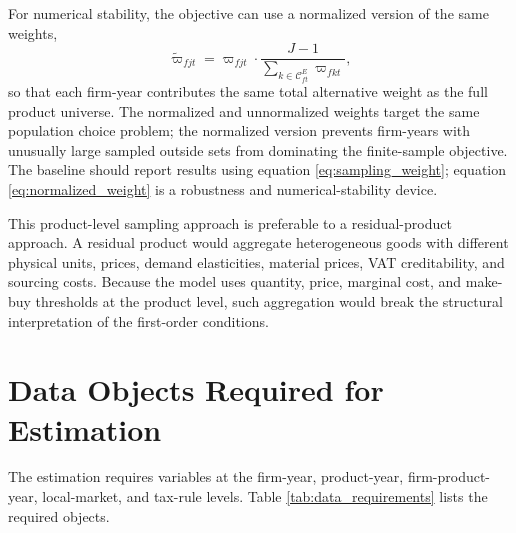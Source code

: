 \documentclass[11pt,a4paper]{article}
\newcommand{\mc}{\mathcal}
\begin{document}
For numerical stability, the objective can use a normalized version of the same weights,
\begin{equation}
    \widetilde\varpi_{fjt}
    =\varpi_{fjt}\cdot
    \frac{J-1}{\sum_{k\in\mc{C}^{E}_{ft}}\varpi_{fkt}},
    \label{eq:normalized_weight}
\end{equation}
so that each firm-year contributes the same total alternative weight as the full product universe. The normalized and unnormalized weights target the same population choice problem; the normalized version prevents firm-years with unusually large sampled outside sets from dominating the finite-sample objective. The baseline should report results using equation \eqref{eq:sampling_weight}; equation \eqref{eq:normalized_weight} is a robustness and numerical-stability device.

This product-level sampling approach is preferable to a residual-product approach. A residual product would aggregate heterogeneous goods with different physical units, prices, demand elasticities, material prices, VAT creditability, and sourcing costs. Because the model uses quantity, price, marginal cost, and make-buy thresholds at the product level, such aggregation would break the structural interpretation of the first-order conditions.

\section{Data Objects Required for Estimation}
\label{sec:data}

The estimation requires variables at the firm-year, product-year, firm-product-year, local-market, and tax-rule levels. Table \ref{tab:data_requirements} lists the required objects.
\end{document}
